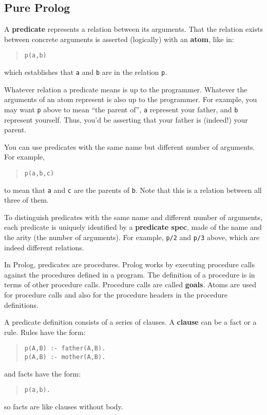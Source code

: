 \subsection{Pure Prolog}
\label{sec:pure}

A {\bf predicate} represents a relation between its arguments. That
the relation exists between concrete arguments is asserted (logically)
with an {\bf atom}, like in:
\begin{quote}
\begin{verbatim}
p(a,b)
\end{verbatim}
\end{quote}
%
which establishes that \verb+a+ and \verb+b+ are in the relation \verb+p+.

Whatever relation a predicate means is up to the programmer. Whatever
the arguments of an atom represent is also up to the programmer. For
example, you may want \verb+p+ above to mean ``the parent of'',
\verb+a+ represent your father, and \verb+b+ represent yourself. Thus,
you'd be asserting that your father is (indeed!) your parent.

You can use predicates with the same name but different number of
arguments. For example, 
\begin{quote}
\begin{verbatim}
p(a,b,c)
\end{verbatim}
\end{quote}
%
to mean that \verb+a+ and \verb+c+ are the parents of \verb+b+. Note
that this is a relation between all three of them. 

To distinguish predicates with the same name and different number of
arguments, each predicate is uniquely identified by a {\bf predicate
  spec}, made of the name and the arity (the number of arguments). For
example, \verb+p/2+ and \verb+p/3+ above, which are indeed different
relations. 

In Prolog, predicates are procedures. Prolog works by executing
procedure calls against the procedures defined in a program. The
definition of a procedure is in terms of other procedure calls. Procedure
calls are called {\bf goals}. Atoms are used for procedure calls and
also for the procedure headers in the procedure definitions.

A predicate definition consists of a series of clauses. A {\bf
  clause} can be a fact or a rule. Rules have the form:
\begin{quote}
\begin{verbatim}
p(A,B) :- father(A,B).
p(A,B) :- mother(A,B).
\end{verbatim}
\end{quote}
%
and facts have the form:
\begin{quote}
\begin{verbatim}
p(a,b).
\end{verbatim}
\end{quote}
%
so facts are like clauses without body.

